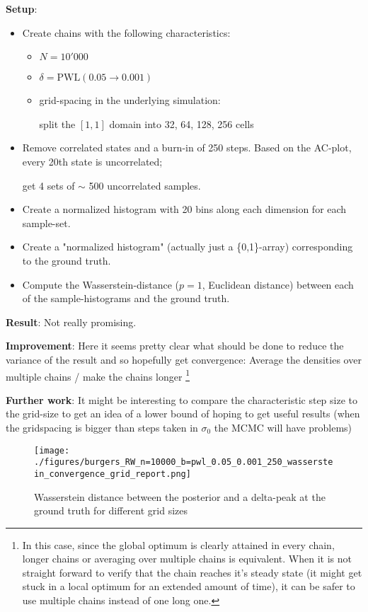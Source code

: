 \documentclass[11pt]{article}
\begin{document}
\begin{enumerate}
\textbf{Setup}:
\begin{itemize}
\item Create chains with the following characteristics:
\begin{itemize}
\item \(N = 10'000\)
\item \(\delta = \text{PWL}(0.05 \to 0.001)\)
\item grid-spacing in the underlying simulation:

split the \([1, 1]\) domain into 32, 64, 128, 256 cells
\end{itemize}

\item Remove correlated states and a burn-in of 250 steps.
Based on the AC-plot, every 20th state is uncorrelated;

get 4 sets of \(\sim\) 500 uncorrelated samples.

\item Create a normalized histogram with 20 bins along each dimension for each sample-set.

\item Create a "normalized histogram" (actually just a \{0,1\}-array) corresponding to the
ground truth.

\item Compute the Wasserstein-distance (\(p=1\), Euclidean distance) between each of the sample-histograms
and the ground truth.
\end{itemize}

\textbf{Result}: Not really promising.

\textbf{Improvement}: Here it seems pretty clear what should be done to reduce the variance of the result
and so hopefully get convergence: Average the densities over multiple chains / make the chains longer \footnote{In this case, since the global optimum is clearly attained in every chain, longer chains or
averaging over multiple chains is equivalent. When it is not straight forward to verify that the chain
reaches it's steady state (it might get stuck in a local optimum for an extended amount of time), it can
be safer to use multiple chains instead of one long one.


}

\textbf{Further work}: It might be interesting to compare the characteristic step size to the grid-size
to get an idea of a lower bound of hoping to get useful results (when the gridspacing is
bigger than steps taken in \(\sigma_0\) the MCMC will have problems)

\begin{figure}[htbp]
\centering
\texttt{[image: ./figures/burgers\_RW\_n=10000\_b=pwl\_0.05\_0.001\_250\_wasserstein\_convergence\_grid\_report.png]}
\caption{\label{fig:wasserstein_grid}
Wasserstein distance between the posterior and a delta-peak at the ground truth for different grid sizes}
\end{figure}
\end{enumerate}
\end{document}
